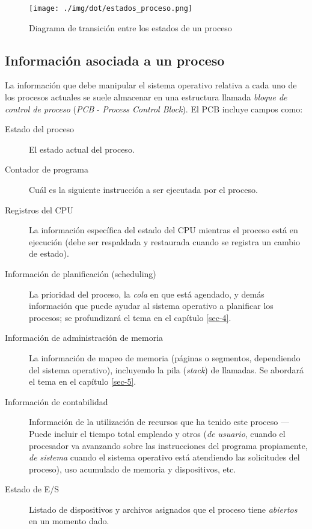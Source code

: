 \documentclass[11pt,fleqn]{book} %
\begin{document}
\begin{figure}[htb]
\centering
\texttt{[image: ./img/dot/estados\_proceso.png]}
\caption{\label{PROC_estados_proceso}Diagrama de transición entre los estados de un proceso}
\end{figure}
\subsection{Información asociada a un proceso}
\label{sec-3-1-2}


La información que debe manipular el sistema operativo relativa a cada
uno de los procesos actuales se suele almacenar en una estructura llamada
\emph{bloque de control de proceso} (\emph{PCB} - \emph{Process Control Block}). El 
PCB incluye campos como:

\begin{description}
\item[Estado del proceso] El estado actual del proceso.
\item[Contador de programa] Cuál es la siguiente instrucción a ser
     ejecutada por el proceso.
\item[Registros del CPU] La información específica del estado del CPU
     mientras el proceso está en ejecución (debe ser respaldada y
     restaurada cuando se registra un cambio de estado).
\item[Información de planificación (scheduling)] La prioridad del
     proceso, la \emph{cola} en que está agendado, y demás información que
     puede ayudar al sistema operativo a planificar los procesos; se
     profundizará el tema en el capítulo \ref{sec-4}.
\item[Información de administración de memoria] La información de mapeo
     de memoria (páginas o segmentos, dependiendo del sistema
     operativo), incluyendo la pila (\emph{stack}) de llamadas. Se abordará
     el tema en el capítulo \ref{sec-5}.
\item[Información de contabilidad] Información de la utilización de
     recursos que ha tenido este proceso — Puede incluir el tiempo
     total empleado y otros (\emph{de usuario}, cuando el procesador va
     avanzando sobre las instrucciones del programa propiamente, \emph{de      sistema} cuando el sistema operativo está atendiendo las
     solicitudes del proceso), uso acumulado de memoria y dispositivos, etc.
\item[Estado de E/S] Listado de dispositivos y archivos asignados que el
                   proceso tiene \emph{abiertos} en un momento dado.
\end{description}
\end{document}
